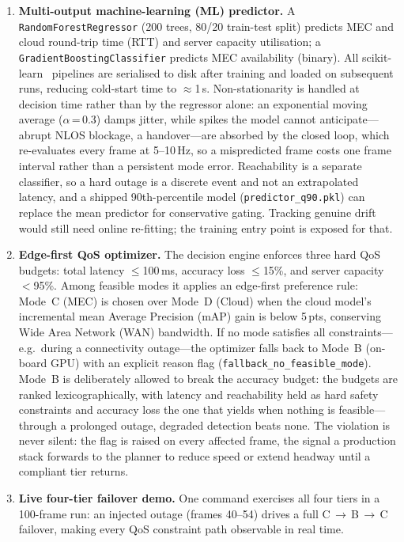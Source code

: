 \documentclass[10pt,conference]{IEEEtran}
\begin{document}
\begin{enumerate}
  \item \textbf{Multi-output machine-learning (ML) predictor.}
        A \texttt{RandomForestRegressor} (200 trees, 80/20 train-test split)
        predicts MEC and cloud round-trip time (RTT) and server capacity
        utilisation; a \texttt{GradientBoostingClassifier} predicts MEC
        availability (binary).  All scikit-learn~\cite{sklearn} pipelines are
        serialised to disk after training and loaded on subsequent runs,
        reducing cold-start time to $\approx$1\,s.  Non-stationarity is
        handled at decision time rather than by the regressor alone: an
        exponential moving average ($\alpha$\,=\,0.3) damps jitter, while
        spikes the model cannot anticipate---abrupt NLOS blockage, a
        handover---are absorbed by the closed loop, which re-evaluates every
        frame at 5--10\,Hz, so a mispredicted frame costs one frame interval
        rather than a persistent mode error.  Reachability is a separate
        classifier, so a hard outage is a discrete event and not an
        extrapolated latency, and a shipped 90th-percentile model
        (\texttt{predictor\_q90.pkl}) can replace the mean predictor for
        conservative gating.  Tracking genuine drift would still need online
        re-fitting; the training entry point is exposed for that.

  \item \textbf{Edge-first QoS optimizer.}
        The decision engine enforces three hard QoS budgets: total latency
        $\leq$100\,ms, accuracy loss $\leq$15\%, and server capacity
        $<$95\%.  Among feasible modes it applies an edge-first preference
        rule: Mode~C (MEC) is chosen over Mode~D (Cloud) when the cloud
        model's incremental mean Average Precision (mAP) gain is below
        5\,pts, conserving Wide Area Network (WAN) bandwidth.
        If no mode satisfies all constraints---e.g.\ during a connectivity
        outage---the optimizer falls back to Mode~B (on-board GPU) with an
        explicit reason flag (\texttt{fallback\_no\_feasible\_mode}).
        Mode~B is deliberately allowed to break the accuracy budget: the
        budgets are ranked lexicographically, with latency and reachability
        held as hard safety constraints and accuracy loss the one that yields
        when nothing is feasible---through a prolonged outage, degraded
        detection beats none.  The violation is never silent: the flag is
        raised on every affected frame, the signal a production stack forwards
        to the planner to reduce speed or extend headway until a compliant tier
        returns.

  \item \textbf{Live four-tier failover demo.}
        One command exercises all four tiers in a 100-frame run: an injected
        outage (frames 40--54) drives a full C\,$\to$\,B\,$\to$\,C failover,
        making every QoS constraint path observable in real time.
\end{enumerate}
\end{document}
